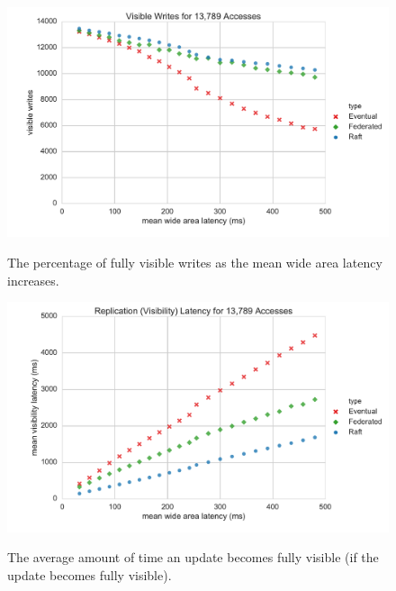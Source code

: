 \begin{figure}
    \begin{center}
        \includegraphics[width=5in]{figures/ch04_latency_visible_writes.pdf}
    \end{center}
    \renewcommand{\baselinestretch}{1}
    \small\normalsize

    \begin{quote}
        \caption[Latency Simulation Visible Writes]{The percentage of fully visible writes as the mean wide area latency increases.}
        \label{fig:ch04_latency_visible_writes}
    \end{quote}
\end{figure}
\renewcommand{\baselinestretch}{2}
\small\normalsize

\begin{figure}
    \begin{center}
        \includegraphics[width=5in]{figures/ch04_latency_visibility_latency.pdf}
    \end{center}
    \renewcommand{\baselinestretch}{1}
    \small\normalsize

    \begin{quote}
        \caption[Latency Simulation Visibility Latency]{The average amount of time an update becomes fully visible (if the update becomes fully visible).}
        \label{fig:ch04_latency_visibility_latency}
    \end{quote}
\end{figure}
\renewcommand{\baselinestretch}{2}
\small\normalsize

